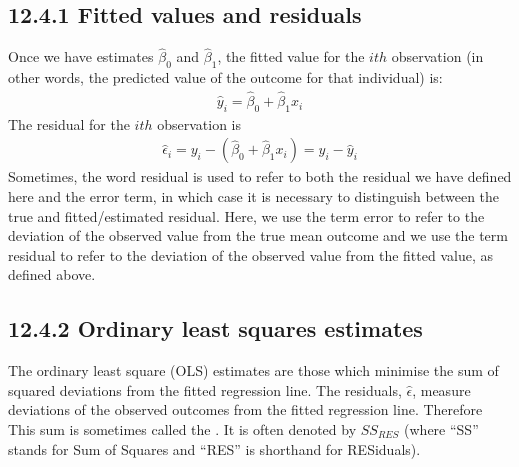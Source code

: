 \documentclass[letterpaper,10pt,english]{jupyterBook}
\begin{document}
\subsection{12.4.1 Fitted values and residuals}
\label{\detokenize{12.e. Linear Regression I:fitted-values-and-residuals}}
\sphinxAtStartPar
{} Once we have estimates \(\hat{\beta}_0\) and \(\hat{\beta}_1\), the fitted value for the \(i{th}\) observation (in other words, the predicted value of the outcome for that individual) is:
\begin{equation*}
\begin{split}
\hat{y}_i = \hat{\beta}_0 + \hat{\beta}_1 x_i
\end{split}
\end{equation*}
\sphinxAtStartPar
{} The residual for the \(i{th}\) observation is
\begin{equation*}
\begin{split}
\hat{\epsilon}_i = y_i - (\hat{\beta}_0 + \hat{\beta}_1 x_i) = y_i - \hat{y}_i
\end{split}
\end{equation*}
\sphinxAtStartPar
Sometimes, the word residual is used to refer to both the residual we have defined here and the error term, in which case it is necessary to distinguish between the true and fitted/estimated residual. Here, we use the term error to refer to the deviation of the observed value from the true mean outcome and we use the term residual to refer to the deviation of the observed value from the fitted value, as defined above.


\subsection{12.4.2 Ordinary least squares estimates}
\label{\detokenize{12.e. Linear Regression I:ordinary-least-squares-estimates}}
\sphinxAtStartPar
The ordinary least square (OLS) estimates are those which minimise the sum of squared deviations from the fitted regression line. The residuals, \(\hat{\epsilon}\), measure deviations of the observed outcomes from the fitted regression line. Therefore This sum is sometimes called the . It is often denoted by \(SS_{RES}\) (where “SS” stands for Sum of Squares and “RES” is shorthand for RESiduals).
\end{document}
